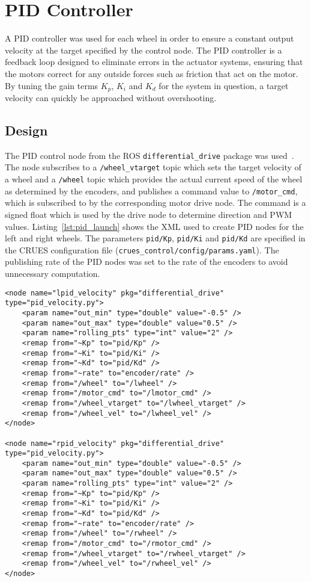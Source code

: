 \section{PID Controller}\label{soft/PID}
A PID controller was used for each wheel in order to ensure a constant output
velocity at the target specified by the control node. The PID controller is
a feedback loop designed to eliminate errors in the actuator systems, ensuring
that the motors correct for any outside forces such as friction that act on the
motor. By tuning the gain terms $K_p$, $K_i$ and $K_d$ for the system in
question, a target velocity can quickly be approached without overshooting.

\subsection{Design}\label{soft/PID/design}
The PID control node from the ROS \verb|differential_drive| package was 
used~\cite{diffdrivelib}. The node subscribes to a \verb|/wheel_vtarget| topic
which sets the target velocity of a wheel and a \verb|/wheel| topic which provides
the actual current speed of the wheel as determined by the encoders, and publishes
a command value to \verb|/motor_cmd|, which is subscribed to by the corresponding
motor drive node. The command is a signed float which is used by the drive node
to determine direction and PWM values. Listing~\ref{lst:pid_launch} shows the
XML used to create PID nodes for the left and right wheels. The parameters
\verb|pid/Kp|, \verb|pid/Ki| and \verb|pid/Kd| are specified in the CRUES
configuration file (\verb|crues_control/config/params.yaml|). The publishing rate
of the PID nodes was set to the rate of the encoders to avoid unnecessary
computation.

\begin{lstlisting}[caption={PID nodes in ROS launch file}, label={lst:pid_launch}, style=xml]
<node name="lpid_velocity" pkg="differential_drive" type="pid_velocity.py">
    <param name="out_min" type="double" value="-0.5" />
    <param name="out_max" type="double" value="0.5" />
    <param name="rolling_pts" type="int" value="2" />
    <remap from="~Kp" to="pid/Kp" />
    <remap from="~Ki" to="pid/Ki" />
    <remap from="~Kd" to="pid/Kd" />
    <remap from="~rate" to="encoder/rate" />
    <remap from="/wheel" to="/lwheel" />
    <remap from="/motor_cmd" to="/lmotor_cmd" />
    <remap from="/wheel_vtarget" to="/lwheel_vtarget" />
    <remap from="/wheel_vel" to="/lwheel_vel" />
</node>

<node name="rpid_velocity" pkg="differential_drive" type="pid_velocity.py">
    <param name="out_min" type="double" value="-0.5" />
    <param name="out_max" type="double" value="0.5" />
    <param name="rolling_pts" type="int" value="2" />
    <remap from="~Kp" to="pid/Kp" />
    <remap from="~Ki" to="pid/Ki" />
    <remap from="~Kd" to="pid/Kd" />
    <remap from="~rate" to="encoder/rate" />
    <remap from="/wheel" to="/rwheel" />
    <remap from="/motor_cmd" to="/rmotor_cmd" />
    <remap from="/wheel_vtarget" to="/rwheel_vtarget" />
    <remap from="/wheel_vel" to="/rwheel_vel" />
</node>
\end{lstlisting}

